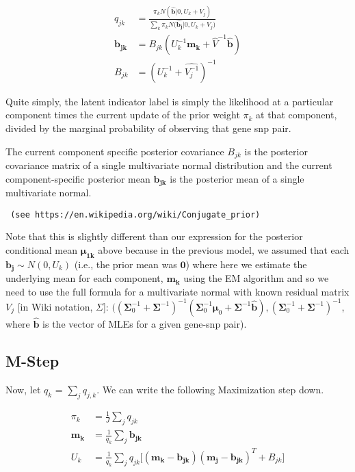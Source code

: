 \documentclass[11pt, oneside]{article}   	%
\begin{document}
\begin{equation}
\begin{align*}
q_{jk} &= \frac{\pi_{k} N (  \hat{\bm{b}} |0,U_{k}+V_{j})}{\sum_{k}{\pi_{k} N (\hat{\bm{b_{j}}}|0,U_{k}+V_{j}})} \\
\bm{b_{jk}} &=  B_{jk} (U_{k}^{-1} \bm{m_{k}}+\hat{V}^{-1}  \hat{\bm{b}}) \\
B_{jk}&=(U_{k}^{-1} + \hat{V_{j}^{-1}})^{-1}
\end{align*}
\end{equation}

Quite simply, the latent indicator label is simply the likelihood at a particular component times the current update of the prior weight $\pi_{k}$ at that component, divided by the marginal probability of observing that gene snp pair.

The current component specific posterior covariance $B_{jk}$ is the posterior covariance matrix of a single multivariate normal distribution and the current component-specific posterior mean $\bm{b_{jk}}$ is the posterior mean of a single multivariate normal. \begin{verbatim} (see https://en.wikipedia.org/wiki/Conjugate_prior)\end{verbatim}

Note that this is slightly different than our expression for the posterior conditional mean $\bm{\mu_{1k}}$ above because in the previous model, we assumed that each $\bm{b_{j}} \sim N(0,U_{k})$ (i.e., the prior mean was $\bm{0}$) where here we estimate the underlying mean for each component, $\bm{m_{k}}$ using the EM algorithm and so we need to use the full formula for a multivariate normal with known residual matrix $V_{j}$ [in Wiki notation, $\Sigma$]: $(\left(\boldsymbol\Sigma_0^{-1} + \boldsymbol\Sigma^{-1}\right)^{-1}\left( \boldsymbol\Sigma_0^{-1}\boldsymbol\mu_0 +  \boldsymbol\Sigma^{-1} \mathbf{\hat{b}} \right),
\left(\boldsymbol\Sigma_0^{-1} + \boldsymbol\Sigma^{-1}\right)^{-1}$, where 
$\mathbf{\hat{b}}$ is the vector of MLEs for a given gene-snp pair).

\subsection{M-Step}
Now, let $q_{k}$ = $\sum_{j}{q_{j,k}}$. We can write the following Maximization step down.


\begin{equation}
\begin{align*}
\pi_{k} &= \frac{1}{J}\sum_{j} {q_{jk}}\\
\bm{m_{k}}&=\frac{1}{q_{k}}\sum_{j}{\bm{b_{jk}}}\\
U_{k} &= \frac{1}{q_{k}}\sum_{j} {q_{jk}[(\bm{m_{k}}-\bm{b_{jk}})(\bm{m_{j}}-\bm{b_{jk}})^{T}+B_{jk}}]
\end{align*}
\end{equation}
\end{document}
